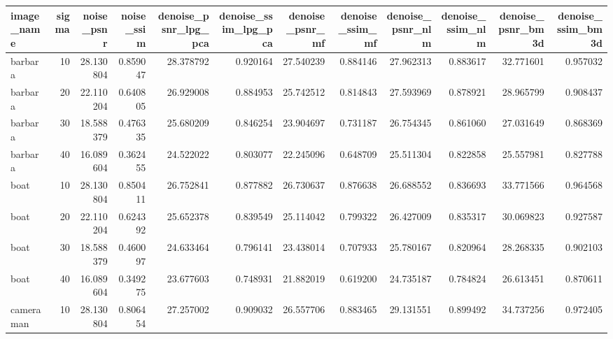 \begin{tabular}{lrrrrrrrrrrr}
\toprule
  image\_name &  sigma &  noise\_psnr &  noise\_ssim &  denoise\_psnr\_lpg\_pca &  denoise\_ssim\_lpg\_pca &  denoise\_psnr\_mf &  denoise\_ssim\_mf &  denoise\_psnr\_nlm &  denoise\_ssim\_nlm &  denoise\_psnr\_bm3d &  denoise\_ssim\_bm3d \\
\midrule
     barbara &     10 &   28.130804 &    0.859047 &             28.378792 &              0.920164 &        27.540239 &         0.884146 &         27.962313 &          0.883617 &          32.771601 &           0.957032 \\
     barbara &     20 &   22.110204 &    0.640805 &             26.929008 &              0.884953 &        25.742512 &         0.814843 &         27.593969 &          0.878921 &          28.965799 &           0.908437 \\
     barbara &     30 &   18.588379 &    0.476335 &             25.680209 &              0.846254 &        23.904697 &         0.731187 &         26.754345 &          0.861060 &          27.031649 &           0.868369 \\
     barbara &     40 &   16.089604 &    0.362455 &             24.522022 &              0.803077 &        22.245096 &         0.648709 &         25.511304 &          0.822858 &          25.557981 &           0.827788 \\
        boat &     10 &   28.130804 &    0.850411 &             26.752841 &              0.877882 &        26.730637 &         0.876638 &         26.688552 &          0.836693 &          33.771566 &           0.964568 \\
        boat &     20 &   22.110204 &    0.624392 &             25.652378 &              0.839549 &        25.114042 &         0.799322 &         26.427009 &          0.835317 &          30.069823 &           0.927587 \\
        boat &     30 &   18.588379 &    0.460097 &             24.633464 &              0.796141 &        23.438014 &         0.707933 &         25.780167 &          0.820964 &          28.268335 &           0.902103 \\
        boat &     40 &   16.089604 &    0.349275 &             23.677603 &              0.748931 &        21.882019 &         0.619200 &         24.735187 &          0.784824 &          26.613451 &           0.870611 \\
   cameraman &     10 &   28.130804 &    0.806454 &             27.257002 &              0.909032 &        26.557706 &         0.883465 &         29.131551 &          0.899492 &          34.737256 &           0.972405 \\

\end{tabular}
